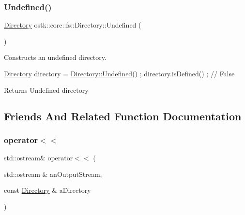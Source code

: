 \subsubsection{\texorpdfstring{Undefined()}{Undefined()}}
{\footnotesize\ttfamily \hyperlink{classostk_1_1core_1_1fs_1_1_directory}{Directory} ostk\+::core\+::fs\+::\+Directory\+::\+Undefined (\begin{DoxyParamCaption}{ }\end{DoxyParamCaption})\hspace{0.3cm}{\ttfamily [static]}}



Constructs an undefined directory. 


\begin{DoxyCode}
\hyperlink{classostk_1_1core_1_1fs_1_1_directory_adc893e10f55282be0d0455e9cfc5796b}{Directory} directory = \hyperlink{classostk_1_1core_1_1fs_1_1_directory_a1ead445a6b0f2b020ab61c2653bb8faa}{Directory::Undefined}() ;
directory.isDefined() ; \textcolor{comment}{// False}
\end{DoxyCode}


\begin{DoxyReturn}{Returns}
Undefined directory 
\end{DoxyReturn}


\subsection{Friends And Related Function Documentation}
\mbox{\label{classostk_1_1core_1_1fs_1_1_directory_a3cbfede39f82ab145f110ca14e21deef}} 
\subsubsection{\texorpdfstring{operator$<$$<$}{operator<<}}
{\footnotesize\ttfamily std\+::ostream\& operator$<$$<$ (\begin{DoxyParamCaption}\item[{std\+::ostream \&}]{an\+Output\+Stream,  }\item[{const \hyperlink{classostk_1_1core_1_1fs_1_1_directory}{Directory} \&}]{a\+Directory }\end{DoxyParamCaption})\hspace{0.3cm}{\ttfamily [friend]}}



